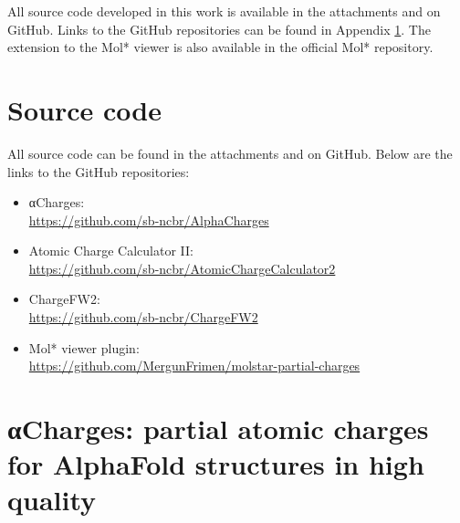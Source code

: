 \documentclass[
  digital,     %
  oneside,     %
  nosansbold,  %
  nocolorbold, %
  lof,         %
  lot,         %
]{fithesis4}
\begin{document}
All source code developed in this work is available in the attachments and on GitHub. Links to the GitHub repositories can be found in Appendix \ref{appendix:source-code}. The extension to the Mol* viewer is also available in the official Mol* repository. 

\printbibliography[heading=bibintoc]

\renewcommand\appendixname{Appendix}
\newpage

\begin{appendices}
  \chapter{Source code}
  \label{appendix:source-code}
  All source code can be found in the attachments and on GitHub. Below are the links to the GitHub repositories:
  \begin{itemize}
    \item αCharges: \\
    \url{https://github.com/sb-ncbr/AlphaCharges}
    \item Atomic Charge Calculator II: \\
    \url{https://github.com/sb-ncbr/AtomicChargeCalculator2}
    \item ChargeFW2: \\
    \url{https://github.com/sb-ncbr/ChargeFW2}
    \item Mol* viewer plugin: \\
    \url{https://github.com/MergunFrimen/molstar-partial-charges}
  \end{itemize}

  \chapter[αCharges paper]{αCharges: partial atomic charges for AlphaFold
  structures in high quality}
  \label{appendix:alpha-charges}
  
\end{appendices}
\end{document}
